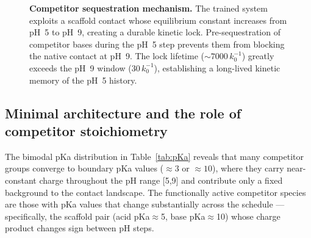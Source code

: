 \documentclass[10pt,twocolumn]{article}
\begin{document}
\begin{figure}[H]
  \centering
  \caption{\textbf{Competitor sequestration mechanism.}
    The trained system exploits a scaffold contact whose equilibrium
    constant increases from pH~5 to pH~9, creating a durable kinetic
    lock.  Pre-sequestration of competitor bases during the pH~5 step
    prevents them from blocking the native contact at pH~9.
    The lock lifetime ($\sim 7000\,k_0^{-1}$) greatly exceeds the
    pH~9 window ($30\,k_0^{-1}$), establishing a long-lived kinetic
    memory of the pH~5 history.}
  \label{fig:mechanism}
\end{figure}

\subsection{Minimal architecture and the role of competitor stoichiometry}

The bimodal pKa distribution in Table~\ref{tab:pKa} reveals that many competitor groups converge to boundary pKa values ($\approx 3$ or $\approx 10$), where they carry near-constant charge throughout the pH range [5,9] and contribute only a fixed background to the contact landscape.
The functionally active competitor species are those with pKa values that change substantially across the schedule — specifically, the scaffold pair (acid pKa$\approx$5, base pKa$\approx$10) whose charge product changes sign between pH steps.
\end{document}
